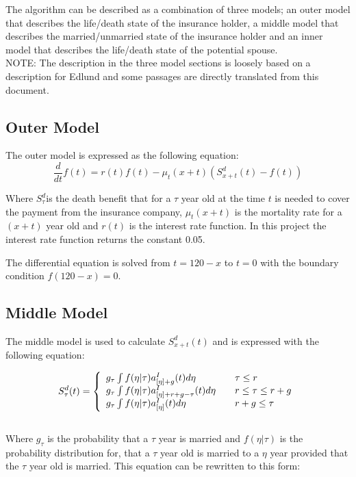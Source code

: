 The algorithm can be described as a combination of three models; an outer model that describes the life/death state of the insurance holder, a middle model that describes the married/unmarried state of the insurance holder and an inner model that describes the life/death state of the potential spouse. \\

NOTE: The description in the three model sections is loosely based on a description for Edlund\cite{edlu} and some passages are directly translated from this document.

\subsection{Outer Model}
The outer model is expressed as the following equation:
\begin{equation}
\frac{d}{dt} f(t) = r(t) f(t) - \mu_t(x+t) (S_{x+t}^d (t) - f(t)) 
\end{equation}

Where $S_\tau^d$is the death benefit that for a $\tau$ year old at the time $t$ is needed to cover the payment from the insurance company, $\mu_t(x+t)$ is the mortality rate for a $(x + t)$ year old and $r(t)$ is the interest rate function. In this project the interest rate function returns the constant 0.05.

The differential equation is solved from $t=120-x$ to $t=0$ with the boundary condition $f(120-x)=0$.

\subsection{Middle Model}
The middle model is used to calculate $S_{x+t}^d (t)$ and is expressed with the following equation: 

\begin{equation}
S_\tau^d(t) = \left\{ 
  \begin{array}{l l}
    	g_\tau \int	f(\eta|\tau)a_{[\eta] + g}^I(t)d\eta									& \quad \text{$\tau \le r$}\\
    	g_\tau \int	f(\eta|\tau)a_{[\eta] + r + g - \tau}^I(t)d\eta 			& \quad \text{$r \leq \tau \le r + g$}\\
			g_\tau \int	f(\eta|\tau)a_{[\eta]}^I(t)d\eta 											& \quad \text{$r +g \leq \tau$}
  \end{array} \right.
\end{equation} \\

Where $g_\tau$ is the probability that a $\tau$ year is married and $f(\eta|\tau)$ is the probability distribution for, that a $\tau$ year old is married to a $\eta$ year provided that the $\tau$ year old is married.
This equation can be rewritten to this form: 

